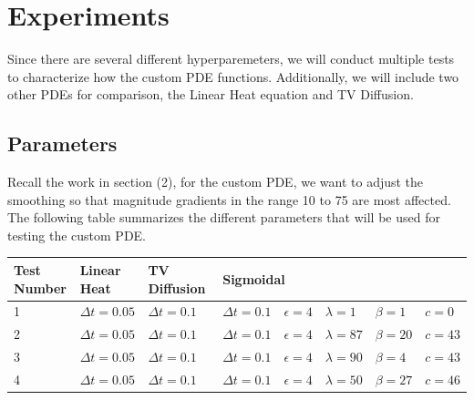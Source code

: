 \documentclass{article}
\begin{document}
  \newpage
  \section{Experiments}
  Since there are several different hyperparemeters, we will conduct
  multiple tests to characterize how the custom PDE functions.
  Additionally, we will include two other PDEs for comparison,
  the Linear Heat equation and TV Diffusion.

  \subsection{Parameters}
  Recall the work in section (2), for the custom PDE, we want to adjust the
  smoothing so that magnitude gradients in the range 10 to 75 are most affected.
  The following table summarizes the different parameters that will be used for
  testing the custom PDE.
    \begin{table}[h]
      \begin{tabular}{|l|l|ll|lllll|}
      \hline
      Test Number & Linear Heat & \multicolumn{2}{l|}{TV Diffusion} & \multicolumn{5}{l|}{Sigmoidal} \\ \hline
      1           &  $\Delta t = 0.05 $    & \multicolumn{1}{l|}{$\Delta t = 0.1$} \ $\epsilon = 4$  &    & \multicolumn{1}{l|}{$\Delta t = 0.1$} & \multicolumn{1}{l|}{$\epsilon = 4$} & \multicolumn{1}{l|}{$\lambda = 1$}  & \multicolumn{1}{l|}{$\beta = 1$}  & $c= 0$  \\ \hline
      2           &  $\Delta t = 0.05 $    & \multicolumn{1}{l|}{$\Delta t = 0.1$} \ $\epsilon = 4$  &    & \multicolumn{1}{l|}{$\Delta t = 0.1$} & \multicolumn{1}{l|}{$\epsilon = 4$} & \multicolumn{1}{l|}{$\lambda = 87$} & \multicolumn{1}{l|}{$\beta = 20$} & $c= 43$ \\ \hline
      3           &  $\Delta t = 0.05 $    & \multicolumn{1}{l|}{$\Delta t = 0.1$} \ $\epsilon = 4$  &    & \multicolumn{1}{l|}{$\Delta t = 0.1$} & \multicolumn{1}{l|}{$\epsilon = 4$} & \multicolumn{1}{l|}{$\lambda = 90$} & \multicolumn{1}{l|}{$\beta = 4$}  & $c= 43$ \\ \hline
      4           &  $\Delta t = 0.05 $    & \multicolumn{1}{l|}{$\Delta t = 0.1$} \ $\epsilon = 4$  &    & \multicolumn{1}{l|}{$\Delta t = 0.1$} & \multicolumn{1}{l|}{$\epsilon = 4$} & \multicolumn{1}{l|}{$\lambda = 50$} & \multicolumn{1}{l|}{$\beta = 27$} & $c= 46$ \\ \hline
      \end{tabular}
    \end{table}
\end{document}
